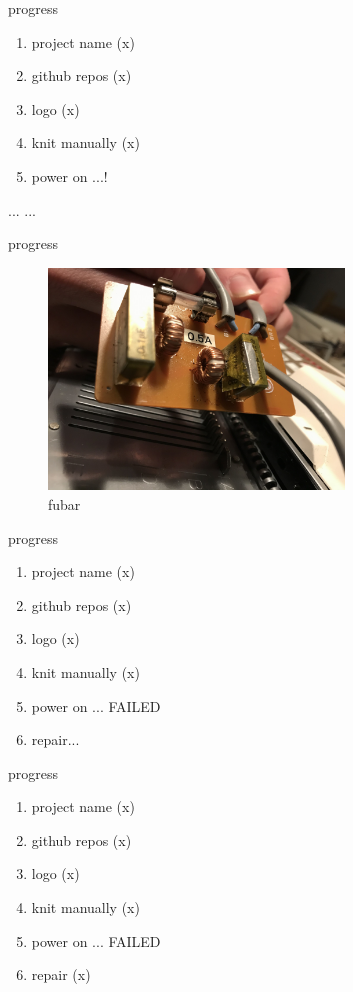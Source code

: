\documentclass{beamer}
\begin{document}
\begin{frame}{progress}
    \begin{enumerate}
        \item project name \pause (x) \pause
        \item github repos \pause (x) \pause
        \item logo \pause (x) \pause
        \item knit manually \pause (x) \pause
        \item power on ...! \pause
    \end{enumerate}
    ... \pause ...
\end{frame}

\begin{frame}{progress}
    \begin{figure}
        \includegraphics[width=0.7\textwidth]{./images/exploded-capacitor.png}
        \caption{fubar}
    \end{figure}
\end{frame}

\begin{frame}{progress}
    \begin{enumerate}
        \item project name (x)
        \item github repos (x)
        \item logo (x)
        \item knit manually (x)
        \item power on ... FAILED\pause
        \item repair...
    \end{enumerate}
\end{frame}


\begin{frame}{progress}
    \begin{enumerate}
        \item project name (x)
        \item github repos (x)
        \item logo (x)
        \item knit manually (x)
        \item power on ... FAILED
        \item repair \pause (x)
    \end{enumerate}
\end{frame}
\end{document}
